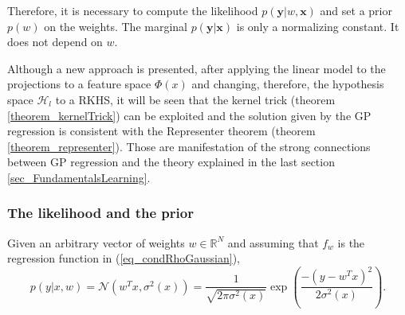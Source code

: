 Therefore, it is necessary to compute the likelihood $p(\pmb{y}|w,\pmb{x})$ and set a prior $p(w)$ on the weights. The marginal $p(\pmb{y}|\pmb{x})$ is only a normalizing constant. It does not depend on $w$.

\begin{remark} \label{remark_GPlearningTheoryConnections}
  Although a new approach is presented, after applying the linear model to the projections to a feature space $\Phi(x)$ and changing, therefore, the hypothesis space $\mathcal{H}_l$ to a RKHS, it will be seen that the kernel trick (theorem \ref{theorem_kernelTrick}) can be exploited and the solution given by the GP regression is consistent with the Representer theorem (theorem \ref{theorem_representer}). Those are manifestation of the strong connections between GP regression and the theory explained in the last section \ref{sec_FundamentalsLearning}.
\end{remark}


\subsubsection{The likelihood and the prior}

Given an arbitrary vector of weights $w \in \mathbb{R}^N$ and assuming that $f_w$ is the regression function in (\ref{eq_condRhoGaussian}),
\begin{equation} \label{eq_condWeights}
  p(y | x,w) = \mathcal{N}(w^Tx, \sigma^2(x)) 
    = \frac{1}{\sqrt{2\pi\sigma^2(x)}}\exp\left( \frac{-(y-w^Tx)^2}{2\sigma^2(x)} \right).
\end{equation}

